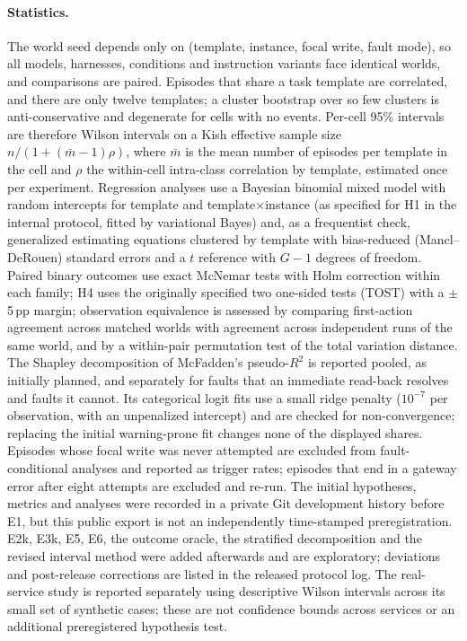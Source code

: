 \paragraph{Statistics.} The world seed depends only on (template, instance, focal write, fault mode), so all
models, harnesses, conditions and instruction variants face identical worlds, and comparisons are paired.
Episodes that share a task template are correlated, and there are only twelve templates; a cluster bootstrap over
so few clusters is anti-conservative and degenerate for cells with no events. Per-cell 95\% intervals are therefore
Wilson intervals on a Kish effective sample size $n/(1+(\bar m-1)\rho)$, where $\bar m$ is the mean number of
episodes per template in the cell and $\rho$ the within-cell intra-class correlation by template, estimated once
per experiment. Regression analyses use a Bayesian binomial mixed model with random intercepts for template and
template$\times$instance (as specified for H1 in the internal protocol, fitted by variational Bayes) and, as a frequentist check,
generalized estimating equations clustered by template with bias-reduced (Mancl--DeRouen) standard errors and a
$t$ reference with $G-1$ degrees of freedom. Paired binary outcomes use exact McNemar tests with Holm correction
within each family; H4 uses the originally specified two one-sided tests (TOST) with a $\pm$5\,pp margin; observation
equivalence is assessed by comparing first-action agreement across matched worlds with agreement across independent
runs of the same world, and by a within-pair permutation test of the total variation distance. The Shapley
decomposition of McFadden's pseudo-$R^2$ is reported pooled, as initially planned, and separately for faults that an
immediate read-back resolves and faults it cannot. Its categorical logit fits use a small ridge penalty
($10^{-7}$ per observation, with an unpenalized intercept) and are checked for non-convergence; replacing the
initial warning-prone fit changes none of the displayed shares. Episodes whose focal write was never attempted are excluded
from fault-conditional analyses and reported as trigger rates; episodes that end in a gateway error after eight
attempts are excluded and re-run. The initial hypotheses, metrics and analyses were recorded in a private Git
development history before E1, but this public export is not an independently time-stamped preregistration.
E2k, E3k, E5, E6, the outcome oracle, the stratified decomposition and the revised interval method were added
afterwards and are exploratory; deviations and post-release corrections are listed in the released protocol log.
The real-service study is reported separately using descriptive Wilson intervals across its small set of
synthetic cases; these are not confidence bounds across services or an additional preregistered hypothesis test.
